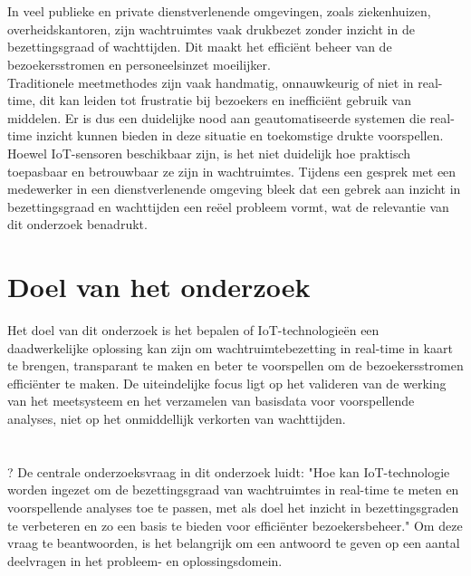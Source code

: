 \section{}%
\label{sec:probleemstelling} \DONE
In veel publieke en private dienstverlenende omgevingen, zoals ziekenhuizen, overheidskantoren, zijn wachtruimtes vaak drukbezet zonder inzicht in de bezettingsgraad of wachttijden. Dit maakt het efficiënt beheer van de bezoekersstromen en personeelsinzet moeilijker. \\  

Traditionele meetmethodes zijn vaak handmatig, onnauwkeurig of niet in real-time, dit kan leiden tot frustratie bij bezoekers en inefficiënt gebruik van middelen. Er is dus een duidelijke nood aan geautomatiseerde systemen die real-time inzicht kunnen bieden in deze situatie en toekomstige drukte voorspellen. Hoewel IoT-sensoren beschikbaar zijn, is het niet duidelijk hoe praktisch toepasbaar en betrouwbaar ze zijn in wachtruimtes. Tijdens een gesprek met een medewerker in een dienstverlenende omgeving bleek dat een gebrek aan inzicht in bezettingsgraad en wachttijden een reëel probleem vormt, wat de relevantie van dit onderzoek benadrukt.

\section{Doel van het onderzoek} \DONE
Het doel van dit onderzoek is het bepalen of IoT-technologieën een daadwerkelijke oplossing kan zijn om wachtruimtebezetting in real-time in kaart te brengen, transparant te maken en beter te voorspellen om de bezoekersstromen efficiënter te maken. De uiteindelijke focus ligt op het valideren van de werking van het meetsysteem en het verzamelen van basisdata voor voorspellende analyses, niet op het onmiddellijk verkorten van wachttijden.

\section{}%
\label{sec:onderzoeksvraag} \WORDENDEVRAGENBEANTWOORD?
De centrale onderzoeksvraag in dit onderzoek luidt: "Hoe kan IoT-technologie worden ingezet om de bezettingsgraad van wachtruimtes in real-time te meten en voorspellende analyses toe te passen, met als doel het inzicht in bezettingsgraden te verbeteren en zo een basis te bieden voor efficiënter bezoekersbeheer." Om deze vraag te beantwoorden, is het belangrijk om een antwoord te geven op een aantal deelvragen in het probleem- en oplossingsdomein.  \\ 

